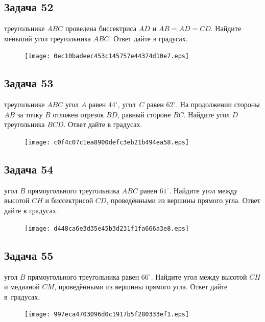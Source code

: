 \documentclass[a4paper,10pt]{article} %
\begin{document}
\begin{spacing}{1.0}
{\subsection*{Задача 52}
 треугольнике $ABC$ проведена биссектриса $AD$ и $AB=AD=CD$. Найдите меньший угол треугольника $ABC$. Ответ дайте в градусах.

\vspace{1.5cm}

\begin{figure}{\texttt{[image: 0ec10badeec453c145757e44374d10e7.eps]}}\end{figure}
\subsection*{Задача 53}
 треугольнике $ABC$ угол $A$ равен $44^\circ$, угол~$C$ равен $62^\circ$. На продолжении стороны $AB$ за точку $B$ отложен отрезок $BD$, равный стороне $BC$. Найдите угол $D$ треугольника $BCD$. Ответ дайте в градусах.

\vspace{1.5cm}

\begin{figure}{\texttt{[image: c0f4c07c1ea8900defc3eb21b494ea58.eps]}}\end{figure}
\subsection*{Задача 54}
 угол $B$ прямоугольного треугольника $ABC$ равен $61^\circ$. Найдите угол между высотой $CH$ и биссектрисой $CD$, проведёнными из вершины прямого угла. Ответ дайте в градусах.

\vspace{1.5cm}

\begin{figure}{\texttt{[image: d448ca6e3d35e45b3d231f1fa666a3e8.eps]}}\end{figure}
\subsection*{Задача 55}
 угол $B$ прямоугольного треугольника равен $66^\circ$. Найдите угол между высотой $CH$ и медианой $CM$, проведёнными из вершины прямого угла. Ответ дайте в~градусах.

\vspace{1.5cm}

\begin{figure}{\texttt{[image: 997eca4703096d0c1917b5f280333ef1.eps]}}\end{figure}
}
\end{spacing}
\end{document}
